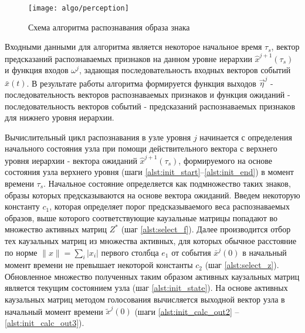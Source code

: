 \documentclass[12pt]{scrartcl}
\newcommand{\linesprval}{1}
\begin{document}
	\begin{figure}
		\centering
		\texttt{[image: algo/perception]}
		\caption{Схема алгоритма распознавания образа знака}
		\label{fig:percept}		
	\end{figure}

	Входными данными для алгоритма является некоторое начальное время $\tau_s$, вектор предсказаний распознаваемых признаков на данном уровне иерархии $\hat x^{j+1}(\tau_s)$ и функция входов $\omega^j$, задающая последовательность входных векторов событий $\bar x(t)$. В результате работы алгоритма формируется функция выходов $\vec \eta^j$ - последовательность векторов распознаваемых признаков и функция ожиданий - последовательность векторов событий - предсказаний распознаваемых признаков для нижнего уровня иерархии.

	\linespread{1}
	\begin{algorithm}[H]
		\label{alg:automato}
		\begin{algorithmic}[1]
			
		\end{algorithmic}
	\end{algorithm}
	\linespread{\linesprval}
	
	Вычислительный цикл распознавания в узле уровня $j$ начинается с определения начального состояния узла при помощи действительного вектора с верхнего уровня иерархии - вектора ожиданий $\hat x^{j+1}(\tau_s)$, формируемого на основе состояния узла верхнего уровня (шаги \ref{alst:init_start}--\ref{alst:init_end}) в момент времени $\tau_s$. Начальное состояние определяется как подмножество таких знаков, образы которых предсказываются на основе вектора ожиданий. Введем некоторую константу $c_1$, которая определяет порог предсказываемого веса распознаваемых образов, выше которого соответствующие каузальные матрицы попадают во множество активных матриц $Z^*$ (шаг \ref{alst:select_f}). Далее производится отбор тех каузальных матриц из множества активных, для которых обычное расстояние по норме $\|x\|=\sum_i |x_i|$ первого столбца $e_1$ от события $\bar x^j(0)$ в начальный момент времени не превышает некоторой константы $c_2$ (шаг \ref{alst:select_z}). Обновленное множество полученных таким образом активных каузальных матриц является текущим состоянием узла (шаг \ref{alst:init_state}). На основе активных каузальных матриц методом голосования вычисляется выходной вектор узла  в начальный момент времени $\tilde x^j(0)$ (шаги \ref{alst:init_calc_out2} -- \ref{alst:init_calc_out3}).
\end{document}
